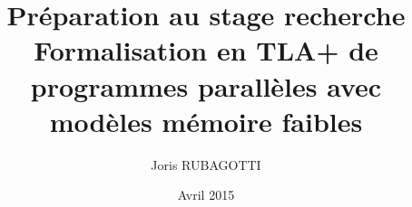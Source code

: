 \documentclass{beamer}
\title{Préparation au stage recherche \\ Formalisation en TLA+ de programmes parallèles avec modèles mémoire faibles}
\author{Joris RUBAGOTTI}
\date{Avril 2015}
\begin{document}
\begin{frame}

\maketitle

\end{frame}
 
\end{document}
